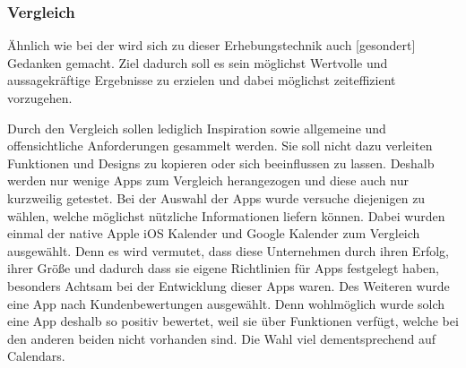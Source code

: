 \subsubsection{Vergleich}\myCheckmark %
Ähnlich wie bei der  wird sich zu dieser Erhebungstechnik auch [gesondert] Gedanken gemacht. Ziel dadurch soll es sein möglichst Wertvolle und aussagekräftige Ergebnisse zu erzielen und dabei möglichst zeiteffizient vorzugehen. 

\myNewSection
Durch den Vergleich sollen lediglich Inspiration sowie allgemeine und \glqq offensichtliche\grqq{} Anforderungen gesammelt werden. %
Sie soll nicht dazu verleiten Funktionen und Designs zu kopieren oder sich beeinflussen zu lassen. %
	Deshalb werden nur wenige Apps zum Vergleich herangezogen und diese auch nur kurzweilig getestet.%
\newline%
Bei der Auswahl der Apps wurde versuche diejenigen zu wählen, welche möglichst nützliche Informationen liefern können. %
	Dabei wurden einmal der native Apple iOS Kalender\cite{A_calendarApple} und Google Kalender\cite{A_calendarGoogle} zum Vergleich ausgewählt. Denn es wird vermutet, dass diese Unternehmen durch ihren Erfolg, ihrer Größe und dadurch dass sie eigene Richtlinien für Apps festgelegt haben\cite{konventionen_guidelinesApple, konventionen_guidelinesGoogle}, besonders Achtsam bei der Entwicklung dieser Apps waren.\newline%
	Des Weiteren wurde eine App nach Kundenbewertungen ausgewählt. Denn wohlmöglich wurde solch eine App deshalb so positiv bewertet, weil sie über Funktionen verfügt, welche bei den anderen beiden nicht vorhanden sind. Die Wahl viel dementsprechend auf Calendars\cite{A_calendarReviews}.%
